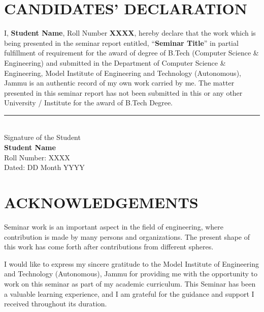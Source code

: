 \documentclass[12pt,a4paper]{report}
\begin{document}
\setcounter{page}{1}

\chapter*{CANDIDATES' DECLARATION}

I, \textbf{Student Name}, Roll Number \textbf{XXXX}, hereby declare that the work which is being presented in the seminar report entitled, ``\textbf{Seminar Title}'' in partial fulfillment of requirement for the award of degree of B.Tech (Computer Science \& Engineering) and submitted in the Department of Computer Science \& Engineering, Model Institute of Engineering and Technology (Autonomous), Jammu is an authentic record of my own work carried by me. The matter presented in this seminar report has not been submitted in this or any other University / Institute for the award of B.Tech Degree.

\vspace{3cm}

\begin{flushright}
\rule{6cm}{0.4pt}\\
Signature of the Student\\
\textbf{Student Name}\\
Roll Number: XXXX\\
\vspace{0.5cm}
Dated: DD Month YYYY
\end{flushright}

\newpage

\chapter*{ACKNOWLEDGEMENTS}

Seminar work is an important aspect in the field of engineering, where contribution is made by many persons and organizations. The present shape of this work has come forth after contributions from different spheres.

I would like to express my sincere gratitude to the Model Institute of Engineering and Technology (Autonomous), Jammu for providing me with the opportunity to work on this seminar as part of my academic curriculum. This Seminar has been a valuable learning experience, and I am grateful for the guidance and support I received throughout its duration.
\end{document}
